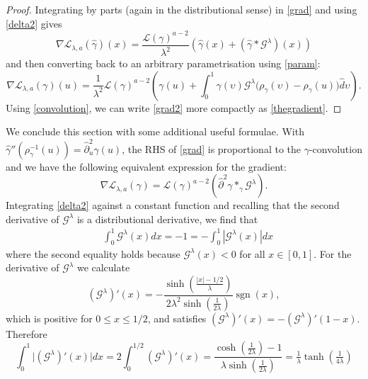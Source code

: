 \documentclass[a4paper,11pt]{amsart}
\theoremstyle{definition}\newtheorem*{definition}{Definition}
\theoremstyle{definition} \newtheorem{proposition}[theorem]{Proposition}
\theoremstyle{definition}\newtheorem{lemma}[theorem]{Lemma}
\theoremstyle{definition}\newtheorem{corollary}[theorem]{Corollary}
\theoremstyle{definition}\newtheorem{example}{Example}
\theoremstyle{remark}\newtheorem*{remark}{Remark}
\def\G{\mathcal G^\lambda}
\newcommand{\abs}[1]{\left | {#1}\right |}
\DeclareMathOperator{\sgn}{sgn}
\def\length{\mathcal L}
\def\hpartial{\hat\partial}
\begin{document}
\begin{proof}
Integrating by parts (again in the distributional sense) in \eqref{grad} and using \eqref{delta2} gives
\begin{equation*}
\nabla\length_{\lambda,a}(\hat\gamma)(x)=\frac{\length (\gamma)^{a-2} }{\lambda^2} \left ( \hat \gamma(x)+(\hat \gamma \ast \mathcal{G}^\lambda)(x)\right )
\end{equation*}
and then converting back to an arbitrary parametrisation using \eqref{param}:
\begin{equation}\label{grad2}
\nabla\length_{\lambda,a}(\gamma)(u)=\frac{1}{ \lambda^2}\length (\gamma)^{a-2} \left (\gamma(u)+\int_0^1 \gamma(\upsilon)\mathcal{G}^\lambda\big( \rho_\gamma(\upsilon)-\rho_\gamma(u)\big ) \hat d\upsilon \right ).
\end{equation}
Using \eqref{convolution}, we can write \eqref{grad2} more compactly as \eqref{thegradient}.
\end{proof}

We conclude this section with some additional useful formulae.
With ${\hat\gamma''(\rho_\gamma^{-1}(u))=\hpartial^2_u\gamma(u)}$, the RHS of \eqref{grad} is proportional to the $\gamma$-convolution and we have the following equivalent expression for the gradient:
\begin{equation}\label{Kgrad}
    \nabla\length_{\lambda,a}(\gamma)=\length(\gamma)^{a-2}(\hpartial^2 \gamma \ast_\gamma \mathcal{G}^\lambda).
\end{equation}
Integrating \eqref{delta2} against a constant function and recalling that the second derivative of $\mathcal G^{\lambda} $ is a distributional derivative, we find that
\begin{align}\label{curlygintegral} 
&\int_0^1 \mathcal G^\lambda  (x)dx =-1 = -\int_0^1 \abs{\mathcal G^\lambda (x)} dx 
\end{align}
where the second equality holds because $\mathcal G^\lambda (x)<0$ for all $x\in [0,1]$. For the derivative of $\G$ we calculate 
\begin{equation*}
(\G) '(x)=-\frac{\sinh(\frac{\abs{x}-1/2}{\lambda})}{2\lambda^2 \sinh(\frac{1}{2\lambda})}\sgn(x),
\end{equation*} 
which is positive for $0\leq x\leq 1/2$, and satisfies $(\G) '(x)=- (\G) '(1-x)$. Therefore
\begin{equation}\label{Gprime}
\int_0^1 \big |( \G) '(x)\big |dx=2\int_0^{1/2}(\G) '(x)=\frac{\cosh(\frac{1}{2\lambda})-1}{\lambda \sinh (\frac{1}{2\lambda})}=\tfrac{1}{\lambda}\tanh(\tfrac{1}{4\lambda})
\end{equation}
\end{document}
